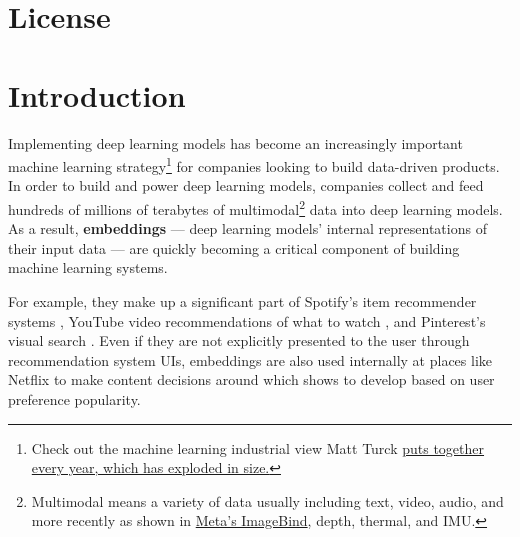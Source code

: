 \documentclass[11pt, table]{diazessay} %
\begin{document}
\begin{sloppypar}
\section*{License}
\doclicenseThis
\newpage

\tableofcontents
\newpage


\section{Introduction}

Implementing deep learning models has become an increasingly important machine learning strategy\footnote{Check out the machine learning industrial view Matt Turck \href{https://mattturck.com/mad2023/}{puts together every year, which has exploded in size.}} for companies looking to build data-driven products. In order to build and power deep learning models, companies collect and feed hundreds of millions of terabytes of multimodal\footnote{Multimodal means a variety of data usually including text, video, audio, and more recently as shown in \href{https://ai.facebook.com/blog/imagebind-six-modalities-binding-ai/}{Meta's ImageBind}, depth, thermal, and IMU.} data into deep learning models. As a result, \textbf{embeddings} --- deep learning models' internal representations of their input data --- are quickly becoming a critical component of building machine learning systems.

For example, they make up a significant part of Spotify's item recommender systems  \citep{hansen2020contextual}, YouTube video recommendations of what to watch  \citep{covington2016deep}, and Pinterest's visual search  \citep{jing2015visual}. Even if they are not explicitly presented to the user through recommendation system UIs, embeddings are also used internally at places like Netflix to make content decisions around which shows to develop based on user preference popularity.


\end{sloppypar}
\end{document}
